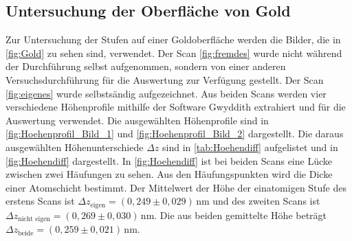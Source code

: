 \subsection{Untersuchung der Oberfläche von Gold}
Zur Untersuchung der Stufen auf einer Goldoberfläche werden die Bilder, die in \autoref{fig:Gold} zu sehen sind, verwendet. Der Scan \ref{fig:fremdes} wurde nicht während der Durchführung selbst aufgenommen, sondern von einer anderen Versuchsdurchführung für die Auswertung zur Verfügung gestellt. Der Scan \ref{fig:eigenes} wurde selbstsändig aufgezeichnet. Aus beiden Scans werden vier verschiedene Höhenprofile mithilfe der Software Gwyddith extrahiert und für die Auswertung verwendet. Die ausgewählten Höhenprofile sind in \autoref{fig:Hoehenprofil_Bild_1} und \autoref{fig:Hoehenprofil_Bild_2} dargestellt. Die daraus ausgewählten Höhenunterschiede $\Delta z$ sind in \autoref{tab:Hoehendiff} aufgelistet und in \autoref{fig:Hoehendiff} dargestellt.
In \autoref{fig:Hoehendiff} ist bei beiden Scans eine Lücke zwischen zwei Häufungen zu sehen. Aus den Häufungspunkten wird die Dicke einer Atomschicht bestimmt. Der Mittelwert der Höhe der einatomigen Stufe des erstens Scans ist $\Delta z_{\text{eigen}} = (0,249 \pm 0,029) \,  \unit{\nano\meter}$ und des zweiten Scans ist $\Delta z_{\text{nicht eigen}} = (0,269 \pm 0,030)\,  \unit{\nano\meter}$. Die aus beiden gemittelte Höhe beträgt $\Delta z_{\text{beide}} = (0,259 \pm 0,021)\,  \unit{\nano\meter}$.


